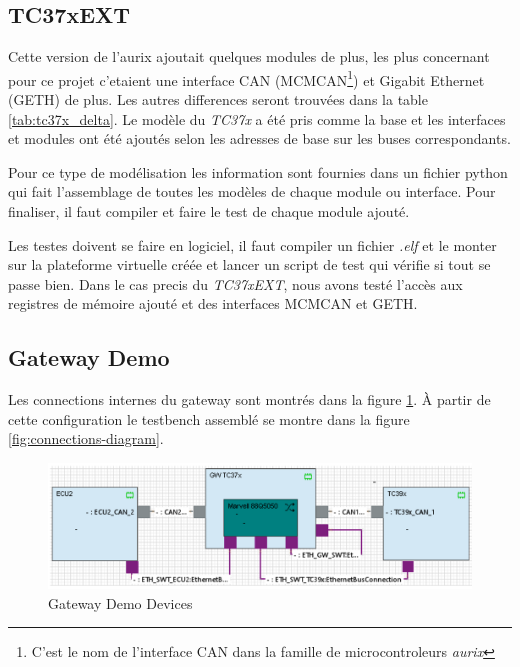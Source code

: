 \subsection{TC37xEXT}

Cette version de l'aurix ajoutait quelques modules de plus, les plus concernant pour ce projet c'etaient une interface CAN (MCMCAN\footnote{C'est le nom de l'interface CAN dans la famille de microcontroleurs \textit{aurix}}) et Gigabit Ethernet (GETH) de plus. Les autres differences seront trouv\'ees dans la table \ref{tab:tc37x_delta}. Le modèle du \textit{TC37x}\cite{aurix.tc37x} a \'et\'e pris comme la base et les interfaces et modules ont \'et\'e ajout\'es selon les adresses de base sur les buses correspondants.



Pour ce type de modélisation les information sont fournies dans un fichier python qui fait l'assemblage de toutes les modèles de chaque module ou interface. Pour finaliser, il faut compiler et faire le test de chaque module ajout\'e.

Les testes doivent se faire en logiciel, il faut compiler un fichier \textit{.elf} et le monter sur la plateforme virtuelle cr\'e\'ee et lancer un script de test qui vérifie si tout se passe bien. Dans le cas precis du \textit{TC37xEXT},  nous avons test\'e l'accès aux registres de mémoire ajout\'e et des interfaces MCMCAN et GETH.

\subsection{Gateway Demo}

Les connections internes du gateway sont montr\'es dans la figure \ref{fig:devices-diagram}. \`A partir de cette configuration le testbench assembl\'e se montre dans la figure \ref{fig:connections-diagram}. %

\begin{figure}[!htb]
 \centering
 \includegraphics[width=\textwidth]{img/GWDemoConnections.PNG}
 \caption{Gateway Demo Devices \cite{gateway-pb}}
 \label{fig:devices-diagram}
\end{figure}

